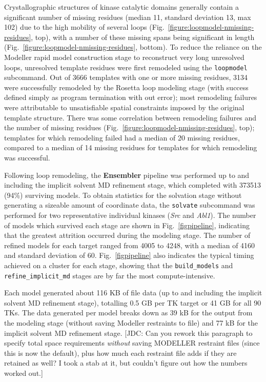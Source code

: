 \documentclass[aps,pre,twocolumn,nofootinbib,superscriptaddress,linenumbers]{revtex4-1}
\begin{document}
Crystallographic structures of kinase catalytic domains generally contain a significant number of missing residues (median 11, standard deviation 13, max 102) due to the high mobility of several loops (Fig.~\ref{figure:loopmodel-nmissing-residues}, top), with a number of these missing spans being significant in length (Fig.~\ref{figure:loopmodel-nmissing-residues}, bottom).
To reduce the reliance on the Modeller rapid model construction stage to reconstruct very long unresolved loops, unresolved template residues were first remodeled using the {\tt loopmodel} subcommand.
Out of \num{3666} templates with one or more missing residues, \num{3134} were successfully remodeled by the Rosetta loop modeling stage (with success defined simply as program termination with out error); most remodeling failures were attributable to unsatisfiable spatial constraints imposed by the original template structure.
There was some correlation between remodeling failures and the number of missing residues (Fig.~\ref{figure:loopmodel-nmissing-residues}, top); templates for which remodeling failed had a median of 20 missing residues, compared to a median of 14 missing residues for templates for which remodeling was successful.

Following loop remodeling, the {\bf Ensembler} pipeline was performed up to and including the implicit solvent MD refinement stage, which completed with \num{373513} (94\%) surviving models.
To obtain statistics for the solvation stage without generating a sizeable amount of coordinate data, the {\tt solvate} subcommand was performed for two representative individual kinases (\emph{Src} and \emph{Abl1}).
The number of models which survived each stage are shown in Fig.~\ref{figpipeline}, indicating that the greatest attrition occurred during the modeling stage.
The number of refined models for each target ranged from 4005 to 4248, with a median of 4160 and standard deviation of 60.
Fig.~\ref{figpipeline} also indicates the typical timing achieved on a cluster for each stage, showing that the {\tt build\_models} and {\tt refine\_implicit\_md} stages are by far the most compute-intensive.

Each model generated about 116 KB of file data (up to and including the implicit solvent MD refinement stage), totalling 0.5 GB per TK target or 41 GB for all 90 TKs.
The data generated per model breaks down as 39 kB for the output from the modeling stage (without saving Modeller restraints to file) and 77 kB for the implicit solvent MD refinement stage.
{\color{red}[JDC: Can you rework this paragraph to specify total space requirements \emph{without} saving MODELLER restraint files (since this is now the default), plus how much each restraint file adds if they are retained as well?  I took a stab at it, but couldn't figure out how the numbers worked out.]}
\end{document}
